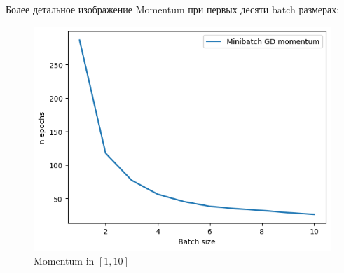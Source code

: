 \documentclass[12pt, a4paper, oneside, final]{article}
\begin{document}
	Более детальное изображение Momentum при первых десяти batch размерах:
	\begin{figure}[H]
		\centering
		\includegraphics[scale = 0.78]{Image/T3_MOMENTUM_1_10.png}
		\caption*{Momentum in $[1, 10]$}
	\end{figure}
\end{document}
